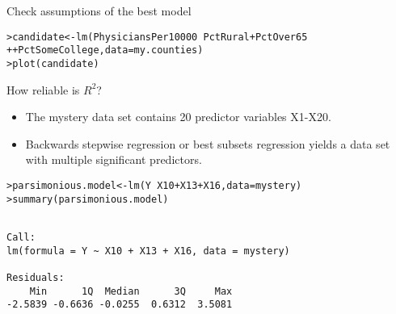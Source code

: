 \documentclass{beamer}\usepackage[]{graphicx}\usepackage[]{color}
\makeatletter
\newcommand{\hlopt}[1]{\textcolor[rgb]{1,0.894,0.769}{#1}}%
\newcommand{\hlstd}[1]{\textcolor[rgb]{1,0.894,0.769}{#1}}%
\newcommand{\hlkwb}[1]{\textcolor[rgb]{0.804,0.776,0.451}{#1}}%
\newcommand{\hlkwc}[1]{\textcolor[rgb]{0.78,0.941,0.545}{#1}}%
\newcommand{\hlkwd}[1]{\textcolor[rgb]{1,0.78,0.769}{#1}}%
\newenvironment{kframe}{%
 \def\at@end@of@kframe{}%
 \ifinner\ifhmode%
  \def\at@end@of@kframe{\end{minipage}}%
  \begin{minipage}{\columnwidth}%
 \fi\fi%
 \def\FrameCommand##1{\hskip\@totalleftmargin \hskip-\fboxsep
 \colorbox{shadecolor}{##1}\hskip-\fboxsep
     \hskip-\linewidth \hskip-\@totalleftmargin \hskip\columnwidth}%
 \MakeFramed {\advance\hsize-\width
   \@totalleftmargin\z@ \linewidth\hsize
   \@setminipage}}%
 {\par\unskip\endMakeFramed%
 \at@end@of@kframe}
\newenvironment{knitrout}{}{} %
\makeatother
\begin{document}
\begin{darkframes}
    \begin{frame}[fragile]{Check assumptions of the best model}
      \fontsm

\begin{knitrout}
\begin{kframe}
\begin{alltt}
\hlstd{> }\hlstd{candidate} \hlkwb{<-} \hlkwd{lm}\hlstd{(PhysiciansPer10000} \hlopt{~} \hlstd{PctRural} \hlopt{+} \hlstd{PctOver65}
\hlstd{+ }                  \hlopt{+} \hlstd{PctSomeCollege,} \hlkwc{data}\hlstd{=my.counties)}
\hlstd{> }\hlkwd{plot}\hlstd{(candidate)}
\end{alltt}
\end{kframe}


\end{knitrout}

    \end{frame}

    \begin{frame}
    \end{frame}

    \begin{frame}{How reliable is $R^2$?}
      \begin{itemize}[<+->]
        \item The mystery data set contains 20 predictor variables X1-X20.
        \item Backwards stepwise regression or best subsets regression yields a data set with multiple significant predictors.
      \end{itemize}
    \end{frame}

    \begin{frame}[fragile]
      \fontvsm
\begin{knitrout}
\begin{kframe}
\begin{alltt}
\hlstd{> }\hlstd{parsimonious.model} \hlkwb{<-} \hlkwd{lm}\hlstd{(Y} \hlopt{~} \hlstd{X10} \hlopt{+} \hlstd{X13} \hlopt{+} \hlstd{X16,} \hlkwc{data}\hlstd{=mystery)}
\hlstd{> }\hlkwd{summary}\hlstd{(parsimonious.model)}
\end{alltt}
\begin{verbatim}

Call:
lm(formula = Y ~ X10 + X13 + X16, data = mystery)

Residuals:
    Min      1Q  Median      3Q     Max 
-2.5839 -0.6636 -0.0255  0.6312  3.5081 


\end{verbatim}
\end{kframe}
\end{knitrout}
\end{frame}
\end{darkframes}
\end{document}
